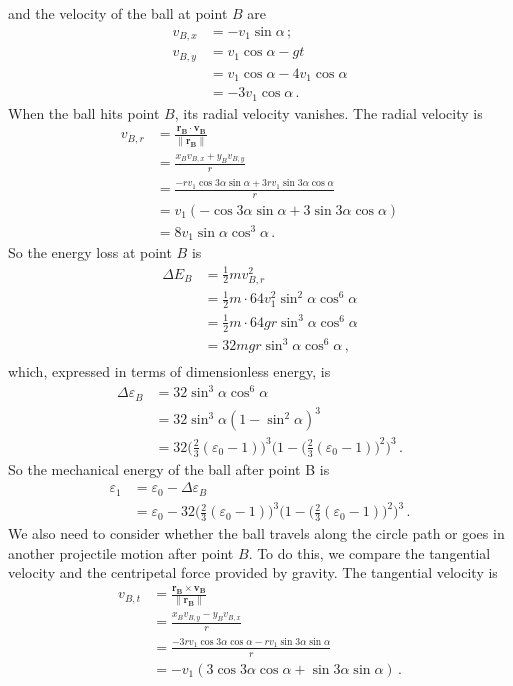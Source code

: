 \documentclass[]{article}
\begin{document}
and the velocity of the ball at point $B$ are
\begin{align*}
v_{B,x} & = -v_1\sin\alpha\,;\\
v_{B,y} & =v_1\cos\alpha - gt\\
&=v_1\cos\alpha - 4v_1\cos\alpha\\
&=-3v_1\cos\alpha\,.
\end{align*}
When the ball hits point $B$, its radial velocity vanishes. The radial velocity is
\begin{align*}
v_{B,r} &= \frac{\mathbf{r_B}\cdot\mathbf{v_B}}{\|\mathbf{r_B}\|}\\
&=\frac{x_Bv_{B,x}+y_Bv_{B,y}}{r}\\
&=\frac{-rv_1\cos3\alpha\sin\alpha+3rv_1\sin3\alpha\cos\alpha}{r}\\
&=v_1(-\cos3\alpha\sin\alpha+3\sin3\alpha\cos\alpha)\\
&=8v_1\sin\alpha\cos^3\alpha\,.
\end{align*}
So the energy loss at point $B$ is
\begin{align*}
\Delta E_B &= \frac{1}{2}mv_{B,r}^2\\
&=\frac{1}{2}m\cdot64v_1^2\sin^2\alpha\cos^6\alpha\\
&=\frac{1}{2}m\cdot64gr\sin^3\alpha\cos^6\alpha\\
&=32mgr\sin^3\alpha\cos^6\alpha\,,\\
\end{align*}
which, expressed in terms of dimensionless energy, is
\begin{align*}
\Delta \varepsilon_B &= 32\sin^3\alpha\cos^6\alpha \\
&=32 \sin^3\alpha (1-\sin^2\alpha)^3 \\
&=32 \Big(\frac{2}{3}(\varepsilon_0 -1)\Big)^3 \Big(1-\Big(\frac{2}{3}(\varepsilon_0 -1)\Big)^2\Big)^3\,.
\end{align*}
So the mechanical energy of the ball after point B is
\begin{align*}
\varepsilon_1 &= \varepsilon_0 - \Delta \varepsilon_B\\
 &= \varepsilon_0 -32 \Big(\frac{2}{3}(\varepsilon_0 -1)\Big)^3 \Big(1-\Big(\frac{2}{3}(\varepsilon_0 -1)\Big)^2\Big)^3\,.
\end{align*}	
We also need to consider whether the ball travels along the circle path or goes in another projectile motion after point $B$. To do this, we compare the tangential velocity and the centripetal force provided by gravity. The tangential velocity is
\begin{align*}
v_{B,t} &= \frac{\mathbf{r_B}\times\mathbf{v_B}}{\|\mathbf{r_B}\|}\\
&= \frac{x_Bv_{B,y}-y_Bv_{B,x}}{r}\\
&= \frac{-3rv_1\cos3\alpha\cos\alpha-rv_1\sin3\alpha\sin\alpha}{r} \\ 
&= -v_1(3\cos3\alpha\cos\alpha + \sin3\alpha\sin\alpha)\,.
\end{align*}
\end{document}
